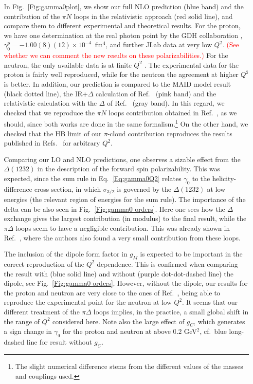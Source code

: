 \documentclass[twocolumn,prc,showpacs,nofootinbib,preprintnumbers,amsmath,amssymb,superscriptaddress]{revtex4-1}
\begin{document}
In Fig.~\ref{Fig:gamma0plot}, we show our full NLO prediction (blue band) and the contribution of the $\pi N$ loops in the relativistic approach (red solid line), and compare them to different experimental and theoretical results. For the proton, we have one determination at the real photon point by the GDH collaboration \cite{Dutz:2003mm}, $\gamma_0^p=-1.00(8)(12)  \times 10^{-4}$~fm$^4$, and further JLab data \cite{Zielinski:2017gwp,Prok:2008ev} at very low $Q^2$.
\textcolor{red}{(See whether we can comment the new results on these polarizabilities.)}
For the neutron, the only available data is at finite $Q^2$ \cite{Amarian:2004yf, Guler:2015}. 
The experimental data for the proton is fairly well reproduced, while for the neutron the agreement at higher $Q^2$ is better.
In addition, our prediction is compared to the MAID model result \cite{Drechsel:2002ar,Amarian:2004yf} (black dotted line), the IR+$\Delta$ calculation of Ref.~\cite{Bernard:2002pw} (pink band) and the relativistic calculation with the $\Delta$ of Ref.~\cite{Bernard:2012hb} (gray band).
In this regard, we checked that we reproduce the $\pi N$ loops contribution obtained in Ref.~\cite{Bernard:2012hb}, as we should, since both works are done in the same formalism.\footnote{The slight numerical difference stems from the different values of the masses and couplings used.}
On the other hand, we checked that the HB limit of our $\pi$-cloud contribution reproduces the results published in Refs.~\cite{Kao:2002cp,Bernard:1995dp} for arbitrary $Q^2$. 


Comparing our LO and NLO predictions, one observes a sizable effect from the $\Delta(1232)$ in the description of the forward spin polarizability. 
This was expected, since the sum rule in Eq.~\eqref{Eq:gamma0Q2} relates $\gamma_0$ to the helicity-difference cross section, in which $\sigma_{3/2}$ is governed by the $\Delta(1232)$ at low energies (the relevant region of energies for the sum rule). The importance of the delta can be also seen in Fig.~\ref{Fig:gamma0-orders}.
Here one sees how the $\Delta$ exchange gives the largest contribution (in modulus) to the final result, while the $\pi \Delta$ loops seem to have a negligible contribution.
This was already shown in Ref.~\cite{Bernard:2002pw}, where the authors also found a very small contribution from these loops. 

The inclusion of the dipole form factor in $g_{M}$ is expected to be important in the correct reproduction of the $Q^2$ dependence.
This is confirmed when comparing the result with (blue solid line) and without (purple dot-dot-dashed line) the dipole, see Fig.~\ref{Fig:gamma0-orders}. However, without the dipole, our results for the proton and neutron are very close to the ones of Ref.~\cite{Bernard:2012hb}, being able to reproduce the experimental point for the neutron at low $Q^2$.
It seems that our different treatment of the $\pi \Delta$ loops implies, in the practice, a small global shift in the range of $Q^2$ considered here. Note also the large effect of $g_C$, which generates a sign change in $\gamma_0$ for the proton and neutron at above $0.2$ GeV$^2$, cf.\ blue long-dashed line for result without $g_C$.
\end{document}
